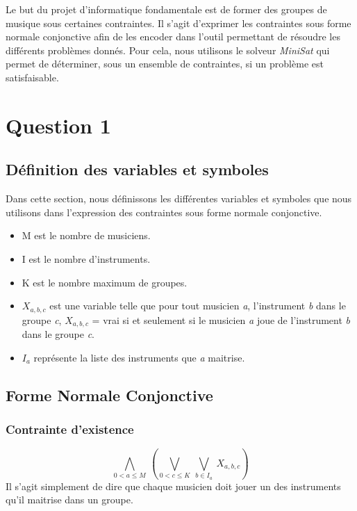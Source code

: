 \documentclass[11pt]{article}
\begin{document}
Le but du projet d'informatique fondamentale est de former des groupes de musique sous certaines contraintes. Il s'agit d'exprimer les contraintes sous forme normale conjonctive afin de les encoder dans l'outil permettant de résoudre les différents problèmes donnés. Pour cela, nous utilisons le solveur \textit{MiniSat} qui permet de déterminer, sous un ensemble de contraintes, si un problème est satisfaisable.

\section{Question 1}

\subsection{Définition des variables et symboles}

Dans cette section, nous définissons les différentes variables et symboles que nous utilisons dans l'expression des contraintes sous forme normale conjonctive.

\begin{itemize}
\item M est le nombre de musiciens.
\item I est le nombre d'instruments.
\item K est le nombre maximum de groupes.
\item $X_{a,b,c}$ est une variable telle que pour tout musicien \textit{a}, l'instrument \textit{b} dans le groupe \textit{c}, $X_{a,b,c}$ = vrai si et seulement si le musicien \textit{a} joue de l’instrument \textit{b} dans le groupe \textit{c}.
\item $I_a$ représente la liste des instruments que \textit{a} maitrise.
\end{itemize}

\subsection{Forme Normale Conjonctive}

\subsubsection{Contrainte d'existence}

$$\bigwedge\limits_{0<a\le M}\ \left(\bigvee\limits_{0<c\le K}\ \bigvee\limits_{b\in I_a}\ X_{a,b,c}\right)$$
Il s'agit simplement de dire que chaque musicien doit jouer un des instruments qu'il maitrise dans un groupe.
\end{document}
